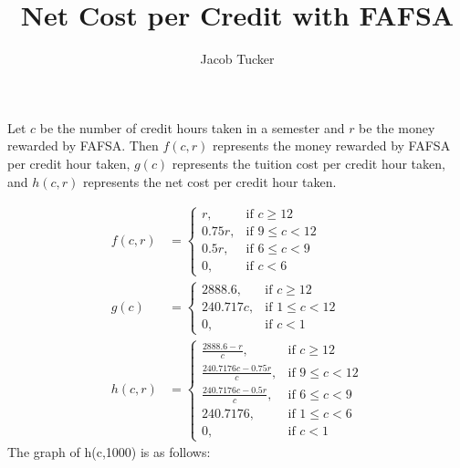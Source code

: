 \documentclass{article}
\title{Net Cost per Credit with FAFSA}
\author{Jacob Tucker}
\begin{document}
\maketitle
\vspace{-0.5cm}

Let $c$ be the number of credit hours taken in a semester and $r$ be the money rewarded by FAFSA. Then $f(c,r)$ represents the money rewarded by FAFSA per credit hour taken, $g(c)$ represents the tuition cost per credit hour taken, and $h(c,r)$ represents the net cost per credit hour taken. 

\begin{align}
  f(c,r) &= \begin{cases}
      r,  &\text{if } c \geq 12 \\
      0.75r,  &\text{if } 9 \leq c < 12 \\
      0.5r,  &\text{if } 6 \leq c < 9 \\
      0,  &\text{if } c < 6
    \end{cases} \\
  g(c) &= \begin{cases}
    2888.6,  &\text{if } c \geq 12 \\
    240.717c,  &\text{if } 1 \leq c < 12 \\
    0,  &\text{if } c < 1 
    \end{cases} \\
  h(c,r) &= \begin{cases}
    \frac{2888.6 - r}{c},  &\text{if } c \geq 12 \\
    \frac{240.7176c - 0.75r}{c},  &\text{if } 9 \leq c < 12 \\
    \frac{240.7176c - 0.5r}{c},  &\text{if } 6 \leq c < 9 \\
    240.7176,  &\text{if } 1 \leq c < 6 \\
    0,  &\text{if } c < 1
    \end{cases}
\end{align}
The graph of h(c,1000) is as follows: \\ \\
\end{document}
